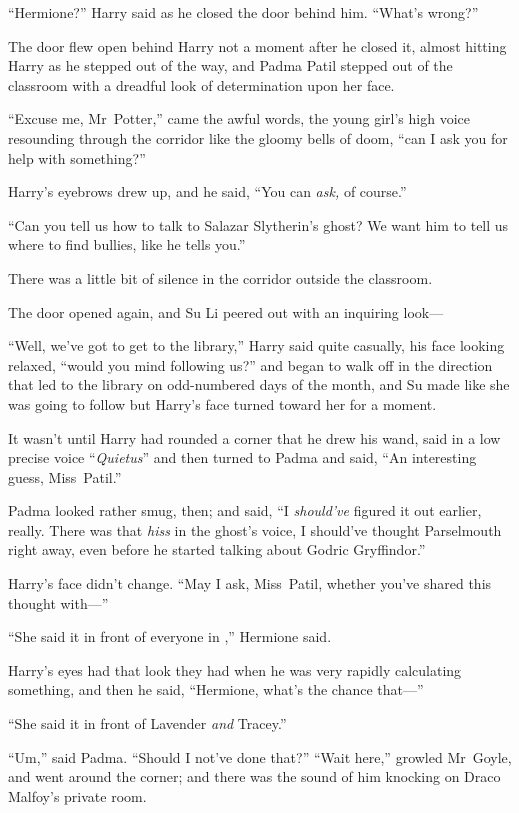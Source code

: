 “Hermione?” Harry said as he closed the door behind him. “What’s wrong?”

The door flew open behind Harry not a moment after he closed it, almost hitting
Harry as he stepped out of the way, and Padma Patil stepped out of the
classroom with a dreadful look of determination upon her face.

“Excuse me, Mr~Potter,” came the awful words, the young girl’s high voice
resounding through the corridor like the gloomy bells of doom, “can I ask you
for help with something?”

Harry’s eyebrows drew up, and he said, “You can \emph{ask,} of course.”

“Can you tell us how to talk to Salazar Slytherin’s ghost? We want him to tell
us where to find bullies, like he tells you.”

There was a little bit of silence in the corridor outside the classroom.

The door opened again, and Su Li peered out with an inquiring look—

“Well, we’ve got to get to the library,” Harry said quite casually, his face
looking relaxed, “would you mind following us?” and began to walk off in the
direction that led to the library on odd-numbered days of the month, and Su
made like she was going to follow but Harry’s face turned toward her for a
moment.

It wasn’t until Harry had rounded a corner that he drew his wand, said in a low
precise voice “\emph{Quietus}” and then turned to Padma and said, “An
interesting guess, Miss~Patil.”

Padma looked rather smug, then; and said, “I \emph{should’ve} figured it out
earlier, really. There was that \emph{hiss} in the ghost’s voice, I should’ve
thought Parselmouth right away, even before he started talking about Godric
Gryffindor.”

Harry’s face didn’t change. “May I ask, Miss~Patil, whether you’ve shared this
thought with—”

“She said it in front of everyone in \SPHEW,” Hermione said.

Harry’s eyes had that look they had when he was very rapidly calculating
something, and then he said, “Hermione, what’s the chance that—”

“She said it in front of Lavender \emph{and} Tracey.”

“Um,” said Padma. “Should I not’ve done that?”
\later
“Wait here,” growled Mr~Goyle, and went around the corner; and there was the
sound of him knocking on Draco Malfoy’s private room.

